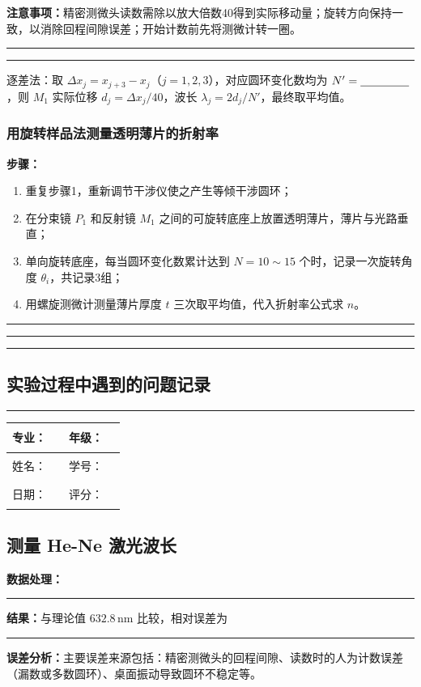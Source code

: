 \documentclass[dvipsnames, svgnames,a4paper,11pt]{article}
\newcommand{\recordblank}[1]{%
  \par\noindent\rule{0.95\linewidth}{0pt}\rule{0pt}{#1}\par}
\begin{document}
\textbf{注意事项：}精密测微头读数需除以放大倍数40得到实际移动量；旋转方向保持一致，以消除回程间隙误差；开始计数前先将测微计转一圈。

\recordblank{5cm}

\recordblank{6cm}

逐差法：取 $\Delta x_j = x_{j+3} - x_j$（$j=1,2,3$），对应圆环变化数均为 $N'=\underline{\hspace{1.5cm}}$，则 $M_1$ 实际位移 $d_j = \Delta x_j / 40$，波长 $\lambda_j = 2d_j / N'$，最终取平均值。

\subsubsection{用旋转样品法测量透明薄片的折射率}

\textbf{步骤：}
\begin{enumerate}
    \item 重复步骤1，重新调节干涉仪使之产生等倾干涉圆环；
    \item 在分束镜 $P_1$ 和反射镜 $M_1$ 之间的可旋转底座上放置透明薄片，薄片与光路垂直；
    \item 单向旋转底座，每当圆环变化数累计达到 $N=10\sim15$ 个时，记录一次旋转角度 $\theta_i$，共记录3组；
    \item 用螺旋测微计测量薄片厚度 $t$ 三次取平均值，代入折射率公式求 $n$。
\end{enumerate}

\recordblank{5cm}

\recordblank{6cm}

\recordblank{6cm}


\subsection{实验过程中遇到的问题记录}
\recordblank{5cm}
\clearpage
\begin{table}
	\renewcommand\arraystretch{1.7}
	\begin{tabularx}{\textwidth}{|X|X|X|X|}
	\hline
	专业：& \rule{2.5cm}{0.4pt} & 年级：& \rule{2.5cm}{0.4pt}\\
	\hline
	姓名：& \rule{2.5cm}{0.4pt} & 学号：& \rule{3cm}{0.4pt}\\
	\hline
	日期：& \rule{3cm}{0.4pt} & 评分：& \rule{3cm}{0.4pt}\\
	\hline
	\end{tabularx}
\end{table}

\subsection{测量 He-Ne 激光波长}
\textbf{数据处理：}
\recordblank{3.2cm}
\textbf{结果：}与理论值 $632.8\,\mathrm{nm}$ 比较，相对误差为
\recordblank{3.2cm}
\textbf{误差分析：}主要误差来源包括：精密测微头的回程间隙、读数时的人为计数误差（漏数或多数圆环）、桌面振动导致圆环不稳定等。
\end{document}
